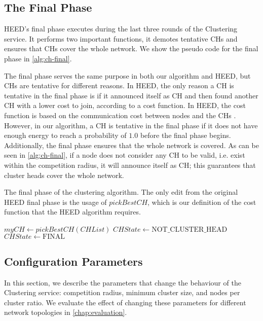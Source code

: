 \subsection{The Final Phase}
\label{subsec:final-phase}
HEED's final phase executes during the last three rounds of the Clustering service. It performs two important functions, it demotes tentative CHs and ensures that CHs cover the whole network. We show the pseudo code for the final phase in \cref{alg:ch-final}.

The final phase serves the same purpose in both our algorithm and HEED, but CHs are tentative for different reasons. In HEED, the only reason a CH is tentative in the final phase is if it announced itself as CH and then found another CH with a lower cost to join, according to a cost function. In HEED, the cost function is based on the communication cost between nodes and the CHs \cite{Younis2004-HEED}. However, in our algorithm, a CH is tentative in the final phase if it does not have enough energy to reach a probability of $1.0$ before the final phase begins. Additionally, the final phase ensures that the whole network is covered. As can be seen in \cref{alg:ch-final}, if a node does not consider any CH to be valid, i.e. exist within the competition radius, it will announce itself as CH; this guarantees that cluster heads cover the whole network.



\begin{algorithm}[bt]
\caption{The final phase of the clustering algorithm. The only edit from the original HEED final phase is the usage of $pickBestCH$, which is our definition of the cost function that the HEED algorithm requires.}
\label{alg:ch-final}
\begin{algorithmic}[1]
            \State $myCH \gets pickBestCH(CHList)$
            \State $CHState \gets \text{NOT\_CLUSTER\_HEAD}$
        \Else
            \State $CHState \gets \text{FINAL}$
        \EndIf
    \EndIf
\EndProcedure
\end{algorithmic}
\end{algorithm}

\subsection{Configuration Parameters}
\label{design:configuration-parameters}
In this section, we describe the parameters that change the behaviour of the Clustering service: competition radius, minimum cluster size, and nodes per cluster ratio. We evaluate the effect of changing these parameters for different network topologies in \cref{chap:evaluation}.

